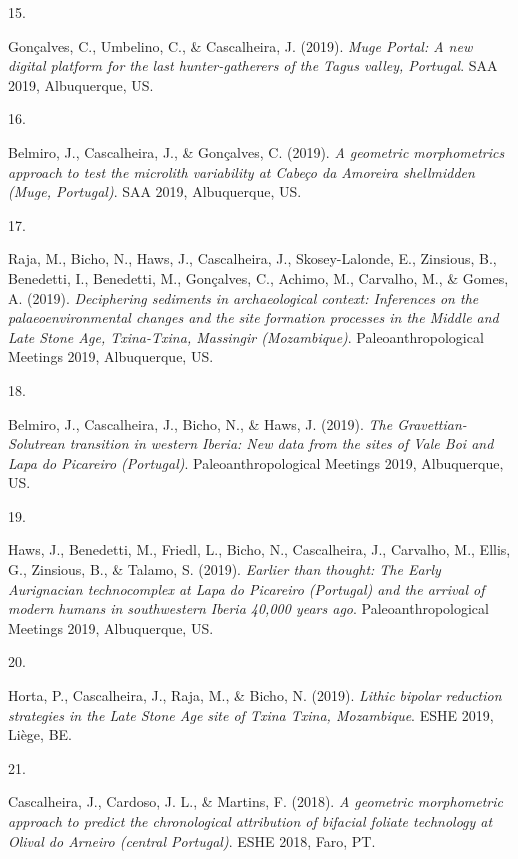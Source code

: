 \documentclass[11pt,a4paper,]{awesome-cv}
\newlength{\cslhangindent}
\newlength{\csllabelwidth}
\newenvironment{CSLReferences}[2] %
 {\begin{list}{}{%
  \setlength{\itemindent}{0pt}
  \setlength{\leftmargin}{0pt}
  \setlength{\parsep}{0pt}
  \ifodd #1
   \setlength{\leftmargin}{\cslhangindent}
   \setlength{\itemindent}{-1\cslhangindent}
  \fi
  \setlength{\itemsep}{#2\baselineskip}}}
 {\end{list}}
\newcommand{\CSLLeftMargin}[1]{\parbox[t]{\csllabelwidth}{\strut#1\strut}}
\newcommand{\CSLRightInline}[1]{\parbox[t]{\linewidth - \csllabelwidth}{\strut#1\strut}}
\begin{document}
\begin{CSLReferences}{0}{0}
\CSLLeftMargin{15. }%
\CSLRightInline{Gonçalves, C., Umbelino, C., \& Cascalheira, J. (2019).
\emph{Muge Portal: A new digital platform for the last hunter-gatherers
of the Tagus valley, Portugal}. SAA 2019, Albuquerque, US.}

\CSLLeftMargin{16. }%
\CSLRightInline{Belmiro, J., Cascalheira, J., \& Gonçalves, C. (2019).
\emph{A geometric morphometrics approach to test the microlith
variability at Cabeço da Amoreira shellmidden (Muge, Portugal)}. SAA
2019, Albuquerque, US.}

\CSLLeftMargin{17. }%
\CSLRightInline{Raja, M., Bicho, N., Haws, J., Cascalheira, J.,
Skosey-Lalonde, E., Zinsious, B., Benedetti, I., Benedetti, M.,
Gonçalves, C., Achimo, M., Carvalho, M., \& Gomes, A. (2019).
\emph{Deciphering sediments in archaeological context: Inferences on the
palaeoenvironmental changes and the site formation processes in the
Middle and Late Stone Age, Txina-Txina, Massingir (Mozambique)}.
Paleoanthropological Meetings 2019, Albuquerque, US.}

\CSLLeftMargin{18. }%
\CSLRightInline{Belmiro, J., Cascalheira, J., Bicho, N., \& Haws, J.
(2019). \emph{The Gravettian-Solutrean transition in western Iberia: New
data from the sites of Vale Boi and Lapa do Picareiro (Portugal)}.
Paleoanthropological Meetings 2019, Albuquerque, US.}

\CSLLeftMargin{19. }%
\CSLRightInline{Haws, J., Benedetti, M., Friedl, L., Bicho, N.,
Cascalheira, J., Carvalho, M., Ellis, G., Zinsious, B., \& Talamo, S.
(2019). \emph{Earlier than thought: The Early Aurignacian technocomplex
at Lapa do Picareiro (Portugal) and the arrival of modern humans in
southwestern Iberia 40,000 years ago}. Paleoanthropological Meetings
2019, Albuquerque, US.}

\CSLLeftMargin{20. }%
\CSLRightInline{Horta, P., Cascalheira, J., Raja, M., \& Bicho, N.
(2019). \emph{Lithic bipolar reduction strategies in the Late Stone Age
site of Txina Txina, Mozambique}. ESHE 2019, Liège, BE.}

\CSLLeftMargin{21. }%
\CSLRightInline{Cascalheira, J., Cardoso, J. L., \& Martins, F. (2018).
\emph{A geometric morphometric approach to predict the chronological
attribution of bifacial foliate technology at Olival do Arneiro (central
Portugal)}. ESHE 2018, Faro, PT.}


\end{CSLReferences}
\end{document}
